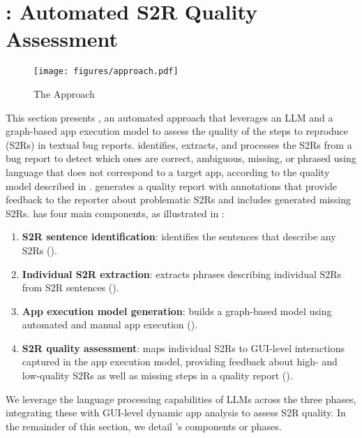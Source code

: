
\section{\tool: Automated S2R Quality Assessment}
\label{sec:approach}
\begin{figure*}[t]
		\vspace{-2em}
		\centering
		\texttt{[image: figures/approach.pdf]}
		\caption{{The \tool Approach}}
		\label{fig:approach}
\end{figure*}

This section presents \tool, an automated approach that leverages an LLM and a graph-based app execution model to assess the quality of the steps to reproduce (S2Rs) in textual bug reports.  
\tool identifies, extracts, and processes the S2Rs from a bug report to detect which ones are correct, ambiguous, missing, or phrased using language that does not correspond to a target app, according to the quality model described in .
 \tool generates a quality report with annotations that provide feedback to the reporter about problematic S2Rs and includes generated missing S2Rs.
\tool has four main components, as illustrated in :
\begin{enumerate}
	\item \textbf{S2R sentence identification}: \tool identifies the sentences that describe any S2Rs ().
	\item \textbf{Individual S2R extraction}: \tool extracts phrases describing individual S2Rs from S2R sentences ().
	\item \textbf{App execution model generation}: \tool builds a graph-based model using automated and manual app execution ().  
	\item \textbf{S2R quality assessment}: \tool maps individual S2Rs to GUI-level interactions captured in the app execution model, providing feedback about high- and low-quality S2Rs as well as missing steps in a quality report ().
\end{enumerate}

We leverage the language processing capabilities of LLMs  across the three phases, integrating these with GUI-level dynamic app analysis to assess S2R quality. 
In the remainder of this section, we detail \tool's components or phases.




